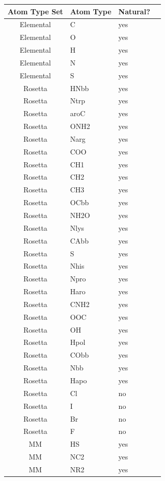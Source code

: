 \begin{table}[!htbp]

\fontsize{7pt}{7pt}
\selectfont

\begin{tabular}{c|lll}
Atom Type Set & Atom Type & Natural?\\
\hline
Elemental & C & yes\\
Elemental & O & yes\\
Elemental & H & yes\\
Elemental & N & yes\\
Elemental & S & yes\\
\hline
Rosetta & HNbb & yes\\
Rosetta & Ntrp & yes\\
Rosetta & aroC & yes\\
Rosetta & ONH2 & yes\\
Rosetta & Narg & yes\\
Rosetta & COO & yes\\
Rosetta & CH1 & yes\\
Rosetta & CH2 & yes\\
Rosetta & CH3 & yes\\
Rosetta & OCbb & yes\\
Rosetta & NH2O & yes\\
Rosetta & Nlys & yes\\
Rosetta & CAbb & yes\\
Rosetta & S & yes\\
Rosetta & Nhis & yes\\
Rosetta & Npro & yes\\
Rosetta & Haro & yes\\
Rosetta & CNH2 & yes\\
Rosetta & OOC & yes\\
Rosetta & OH & yes\\
Rosetta & Hpol & yes\\
Rosetta & CObb & yes\\
Rosetta & Nbb & yes\\
Rosetta & Hapo & yes\\
\hline
Rosetta & Cl & no\\
Rosetta & I & no\\
Rosetta & Br & no\\
Rosetta & F & no\\
\hline
MM & HS & yes\\
MM & NC2 & yes\\
MM & NR2 & yes\\

\end{tabular}
\end{table}
